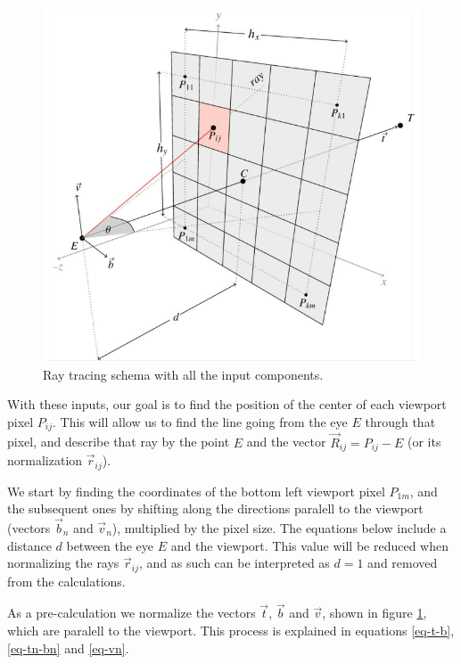 \begin{figure}[hbt!]
    \centering
    \includegraphics[width=1.0\textwidth]{figuras/RaysViewportSchema.png}
    \caption{Ray tracing schema with all the input components.}
    \label{RaysViewportSchema}
\end{figure}

With these inputs, our goal is to find the position of the center of each viewport pixel $P_{ij}$. This will allow us to find the line going from the eye $E$ through that pixel, and describe that ray by the point $E$ and the vector $\overrightarrow{R}_{ij} = P_{ij} - E$ (or its normalization $\overrightarrow{r}_{ij}$).

We start by finding the coordinates of the bottom left viewport pixel $P_{1m}$, and the subsequent ones by shifting along the directions paralell to the viewport (vectors $\overrightarrow{b}_{n}$ and $\overrightarrow{v}_{n}$), multiplied by the pixel size. The equations below include a distance $d$ between the eye $E$ and the viewport. This value will be reduced when normalizing the rays $\overrightarrow{r}_{ij}$, and as such can be interpreted as $d=1$ and removed from the calculations.

As a pre-calculation we normalize the vectors $\overrightarrow{t}$, $\overrightarrow{b}$ and $\overrightarrow{v}$, shown in figure \ref{RaysViewportSchema}, which are paralell to the viewport. This process is explained in equations \ref{eq-t-b}, \ref{eq-tn-bn} and \ref{eq-vn}.


